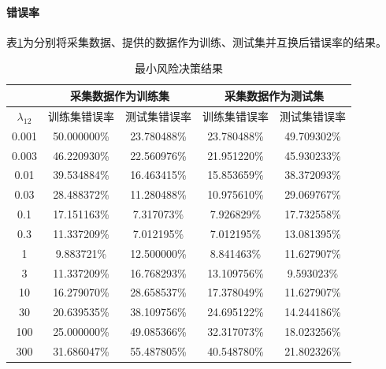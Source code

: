 \paragraph{错误率} 表\ref{tab:minrisk}为分别将采集数据、提供的数据作为训练、测试集并互换后错误率的结果。
\begin{table}
	\centering
	\begin{tabular}{|c|c|c|c|c|}
		\hline
		& \multicolumn{2}{|c|}{采集数据作为训练集} & \multicolumn{2}{|c|}{采集数据作为测试集} \\
		\hline
		$\lambda_{12}$ & 训练集错误率 & 测试集错误率 & 训练集错误率 & 测试集错误率 \\
		\hline
		0.001 & 50.000000\% & 23.780488\% & 23.780488\% & 49.709302\% \\
		0.003 & 46.220930\% & 22.560976\% & 21.951220\% & 45.930233\% \\
		0.01 & 39.534884\% & 16.463415\% & 15.853659\% & 38.372093\% \\
		0.03 & 28.488372\% & 11.280488\% & 10.975610\% & 29.069767\% \\
		0.1 & 17.151163\% & 7.317073\% & 7.926829\% & 17.732558\% \\
		0.3 & 11.337209\% & 7.012195\% & 7.012195\% & 13.081395\% \\
		1 & 9.883721\% & 12.500000\% & 8.841463\% & 11.627907\% \\
		3 & 11.337209\% & 16.768293\% & 13.109756\% & 9.593023\% \\
		10 & 16.279070\% & 28.658537\% & 17.378049\% & 11.627907\% \\
		30 & 20.639535\% & 38.109756\% & 24.695122\% & 14.244186\% \\
		100 & 25.000000\% & 49.085366\% & 32.317073\% & 18.023256\% \\
		300 & 31.686047\% & 55.487805\% & 40.548780\% & 21.802326\% \\
		\hline
	\end{tabular}
	\caption{最小风险决策结果}
	\label{tab:minrisk}
\end{table}

